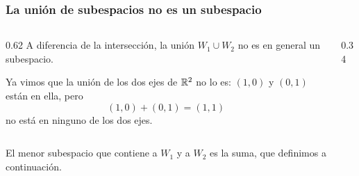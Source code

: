 \begin{frame}
    \frametitle{La unión de subespacios no es un subespacio}

    \begin{columns}[T]
        \begin{column}{0.62\textwidth}
            A diferencia de la intersección, la unión $W_1\cup W_2$
            no es en general un subespacio.

            \medskip

            Ya vimos que la unión de los dos ejes de $\mathbb{R}^2$ no lo es:
            $(1,0)$ y $(0,1)$ están en ella, pero
            \[
                (1,0)+(0,1)=(1,1)
            \]
            no está en ninguno de los dos ejes.
        \end{column}
        \begin{column}{0.34\textwidth}
            \centering
        \end{column}
    \end{columns}

    \medskip

    El menor subespacio que contiene a $W_1$ y a $W_2$ es la
    \alert{suma}, que definimos a continuación.
\end{frame}



